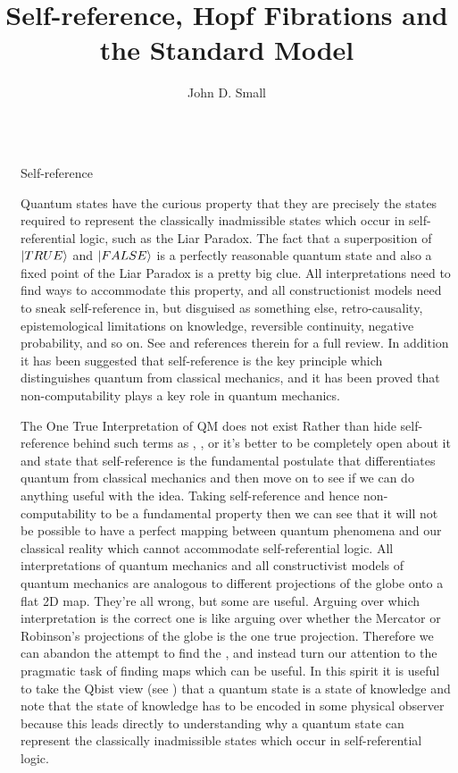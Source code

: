 \documentclass[final]{beamer}
\title{Self-reference, Hopf Fibrations and the Standard Model}
\author{John D. Small}
\newlength{\sepwidth}
\newlength{\colwidth}
\newcommand{\separatorcolumn}{\begin{column}{\sepwidth}\end{column}}
\begin{document}
\begin{frame}[t]
\begin{columns}[t]
\separatorcolumn

\begin{column}{\colwidth}

  \begin{block}{Self-reference}

    Quantum states have the curious property that they are precisely the states required to represent the classically inadmissible states which occur in self-referential logic, such as the Liar Paradox. The fact that a superposition of $\ket{TRUE}$ and $\ket{FALSE}$ is a perfectly reasonable quantum state and also a fixed point of the Liar Paradox is a pretty big clue. All interpretations need to find ways to accommodate this property, and all constructionist models need to sneak self-reference in, but disguised as something else, retro-causality, epistemological limitations on knowledge, reversible continuity, negative probability, and so on. See \autocite{svozil_k_2018} and references therein for a full review. In addition it has been suggested that self-reference is the key principle which distinguishes quantum from classical mechanics, \autocite{Wheeler1974, szangolies_j_2018, szangolies_2020, Realpe-Gomez2020} and it has been proved \autocite{bendersky_non_computable_2016,calude_value_indefiniteness_2006} that non-computability plays a key role in quantum mechanics.
\end{block}
\begin{block}{The One True Interpretation of QM does not exist}
    Rather than hide self-reference behind such terms as , ,  or  it's better to be completely open about it and state that self-reference is the fundamental postulate that differentiates quantum from classical mechanics and then move on to see if we can do anything useful with the idea. Taking self-reference and hence non-computability to be a fundamental property then we can see that it will not be possible to have a perfect mapping between quantum phenomena and our classical reality which cannot accommodate self-referential logic. All interpretations of quantum mechanics and all constructivist models of quantum mechanics are analogous to different projections of the globe onto a flat 2D map. They're all wrong, but some are useful. Arguing over which interpretation is the correct one is like arguing over whether the Mercator or Robinson's projections of the globe is the one true projection. Therefore we can abandon the attempt to find the , and instead turn our attention to the pragmatic task of finding maps which can be useful. In this spirit it is useful to take the Qbist view (see \autocite{Fuchs2015}) that a quantum state is a state of knowledge and note that the state of knowledge has to be encoded in some physical observer because this leads directly to understanding why a quantum state can represent the classically inadmissible states which occur in self-referential logic. 
  \end{block}


\end{column}
\end{columns}
\end{frame}
\end{document}
